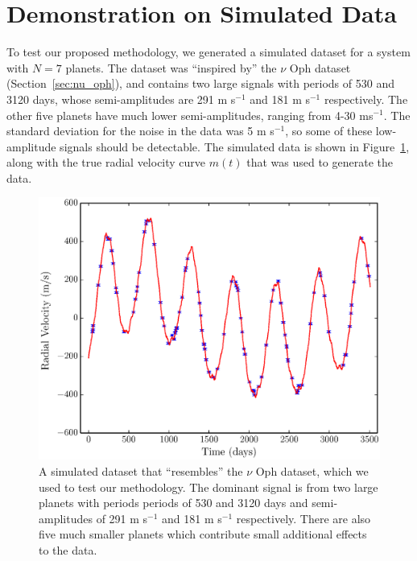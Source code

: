 \documentclass[useAMS,usenatbib]{mn2e}
\begin{document}
\section{Demonstration on Simulated Data}\label{sec:fake_data}
To test our proposed methodology, we generated a simulated dataset for a
system with $N=7$ planets. The dataset was ``inspired by'' the $\nu$ Oph
dataset (Section~\ref{sec:nu_oph}), and contains two large signals with
periods of 530 and 3120 days, whose semi-amplitudes are
291 m s$^{-1}$ and 181 m s$^{-1}$ respectively. The other five planets have
much lower semi-amplitudes, ranging from 4-30 ms$^{-1}$. The standard deviation
for the noise in the data was 5 m s$^{-1}$, so some of these low-amplitude
signals should be detectable. The simulated data is shown in
Figure~\ref{fig:fake_data}, along with the true radial velocity curve $m(t)$
that was used to generate the data.

\begin{figure}
\includegraphics[scale=0.4]{Figures/fake_data.eps}
\caption{A simulated dataset that ``resembles'' the $\nu$ Oph dataset, which
we used to test our methodology. The dominant signal is from two large
planets with periods periods of 530 and 3120 days and semi-amplitudes of
291 m s$^{-1}$ and 181 m s$^{-1}$ respectively. There are also five
much smaller planets which contribute small additional effects to the data.
\label{fig:fake_data}}
\end{figure}
\end{document}
